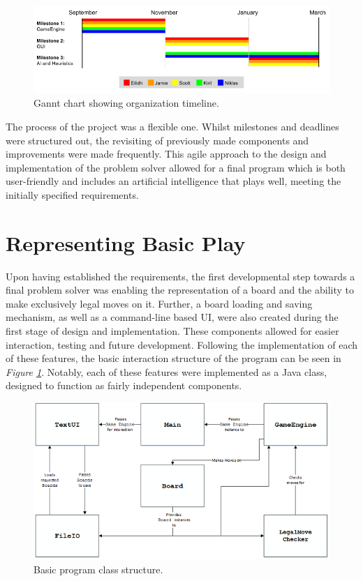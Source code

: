 \documentclass{l3proj}
\begin{document}
\begin{figure}[H]
\centering
\includegraphics[scale=0.5]{Images/GanntChart.png}
\caption{Gannt chart showing organization timeline.}
\end{figure}

The process of the project was a flexible one. Whilst milestones and deadlines were structured out, the revisiting of previously made components and improvements were made frequently. This agile approach to the design and implementation of the problem solver allowed for a final program which is both user-friendly and includes an artificial intelligence that plays well, meeting the initially specified requirements.

\section{Representing Basic Play}

Upon having established the requirements, the first developmental step towards a final problem solver was enabling the representation of a board and the ability to make exclusively legal moves on it. Further, a board loading and saving mechanism, as well as a command-line based UI, were also created during the first stage of design and implementation. These components allowed for easier interaction, testing and future development. Following the implementation of each of these features, the basic interaction structure of the program can be seen in \textit{Figure  \ref{fig:basic_program}}. Notably, each of these features were implemented as a Java class, designed to function as fairly independent components.

\begin{figure}[H]
\centering
\includegraphics[scale=1]{Images/S33Diagram.png}
\caption{Basic program class structure.} \label{fig:basic_program}
\end{figure}
\end{document}
